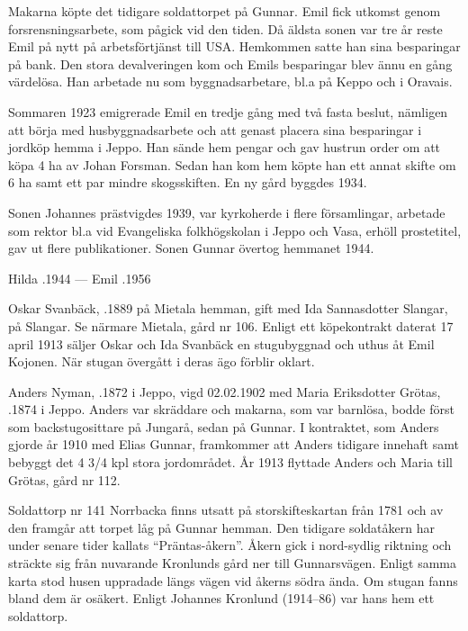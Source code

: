 Makarna köpte det tidigare soldattorpet på Gunnar. Emil fick utkomst genom forsrensningsarbete, som pågick vid den tiden. Då äldsta sonen var tre år reste Emil på nytt på arbetsförtjänst till USA. Hemkommen satte han sina besparingar på bank. Den stora devalveringen kom och Emils besparingar blev ännu en gång värdelösa. Han arbetade nu som byggnadsarbetare, bl.a på Keppo och i Oravais.

Sommaren 1923 emigrerade Emil en tredje gång med två fasta beslut, nämligen att börja med husbyggnadsarbete och att genast placera sina besparingar i jordköp hemma i Jeppo. Han sände hem pengar och gav hustrun order om att köpa 4 ha av Johan Forsman. Sedan han kom hem köpte han ett annat skifte om 6 ha samt ett par mindre skogsskiften. En ny gård byggdes 1934.

Sonen Johannes prästvigdes 1939, var kyrkoherde i flere församlingar, arbetade som rektor bl.a vid  Evangeliska folkhögskolan i Jeppo och Vasa, erhöll prostetitel, gav ut flere publikationer. Sonen Gunnar övertog hemmanet 1944.

Hilda .1944  ---  Emil .1956


%
Oskar Svanbäck, .1889 på Mietala hemman, gift med Ida Sannasdotter Slangar,  på Slangar. Se närmare Mietala, gård nr 106. Enligt ett köpekontrakt daterat 17 april 1913 säljer Oskar och Ida Svanbäck en stugubyggnad och uthus åt Emil Kojonen. När stugan övergått i deras ägo förblir oklart.


%
Anders Nyman, .1872 i Jeppo, vigd 02.02.1902 med Maria Eriksdotter Grötas, .1874 i Jeppo. Anders var skräddare och makarna, som var barnlösa, bodde först som backstugosittare på Jungarå, sedan på Gunnar. I kontraktet, som Anders gjorde år 1910 med Elias Gunnar, framkommer att Anders tidigare innehaft samt bebyggt det 4 3/4 kpl stora jordområdet. År 1913 flyttade Anders och Maria till Grötas, gård nr 112.


%
Soldattorp nr 141 Norrbacka finns utsatt på storskifteskartan från 1781 och av den framgår att torpet låg på Gunnar hemman. Den tidigare soldatåkern har under senare tider kallats ``Präntas-åkern''. Åkern gick i nord-sydlig riktning och sträckte sig från nuvarande Kronlunds gård ner till Gunnarsvägen. Enligt samma karta stod husen uppradade längs vägen vid åkerns södra ända. Om stugan fanns bland dem är osäkert. Enligt Johannes Kronlund (1914--86) var hans hem ett soldattorp.

